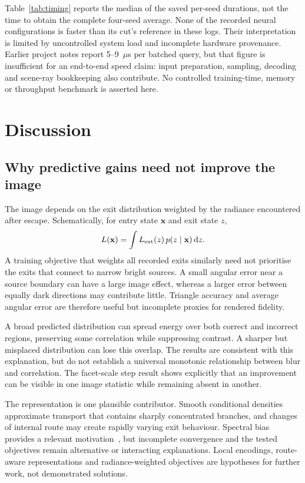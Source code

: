 \documentclass[conference]{IEEEtran}
\begin{document}
Table~\ref{tab:timing} reports the median of the saved per-seed durations, not
the time to obtain the complete four-seed average. None of the recorded neural
configurations is faster than its cut's reference in these logs. Their
interpretation is limited by uncontrolled system load and incomplete hardware
provenance. Earlier project notes report 5--9~$\mu$s per batched query, but that
figure is insufficient for an end-to-end speed claim: input preparation,
sampling, decoding and scene-ray bookkeeping also contribute. No controlled
training-time, memory or throughput benchmark is asserted here.

\section{Discussion}
\subsection{Why predictive gains need not improve the image}
The image depends on the exit distribution weighted by the radiance encountered
after escape. Schematically, for entry state $\mathbf{x}$ and exit state $z$,
\begin{equation}
 L(\mathbf{x})=\int L_{\rm ext}(z)\,p(z\mid\mathbf{x})\,\mathrm{d}z.
\end{equation}
A training objective that weights all recorded exits similarly need not
prioritise the exits that connect to narrow bright sources. A small angular
error near a source boundary can have a large image effect, whereas a larger
error between equally dark directions may contribute little. Triangle accuracy
and average angular error are therefore useful but incomplete proxies for
rendered fidelity.

A broad predicted distribution can spread energy over both correct and
incorrect regions, preserving some correlation while suppressing contrast. A
sharper but misplaced distribution can lose this overlap. The results are
consistent with this explanation, but do not establish a universal monotonic
relationship between blur and correlation. The facet-scale step result shows
explicitly that an improvement can be visible in one image statistic while
remaining absent in another.

The representation is one plausible contributor. Smooth conditional densities
approximate transport that contains sharply concentrated branches, and changes
of internal route may create rapidly varying exit behaviour. Spectral bias
provides a relevant motivation~\cite{rahaman2019}, but incomplete convergence
and the tested objectives remain alternative or interacting explanations.
Local encodings, route-aware representations and radiance-weighted objectives
are hypotheses for further work, not demonstrated solutions.
\end{document}
